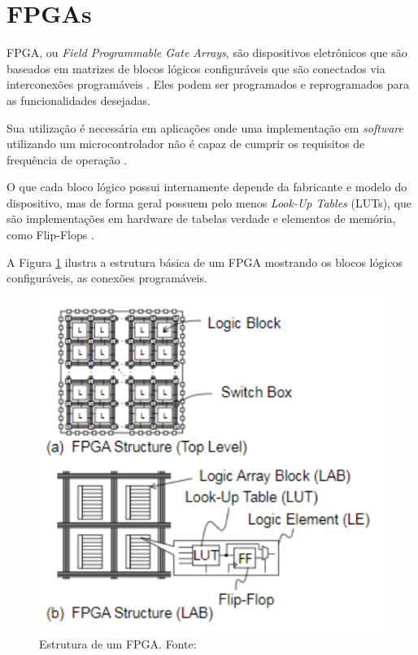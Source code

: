 \section{FPGAs}

FPGA, ou \textit{Field Programmable Gate Arrays}, são dispositivos eletrônicos que são baseados em matrizes de blocos lógicos configuráveis que são conectados via interconexões programáveis \cite{AmdFpga}. Eles podem ser programados e reprogramados para as funcionalidades desejadas.

Sua utilização é necessária em aplicações onde uma implementação em \textit{software} utilizando um microcontrolador não é capaz de cumprir os requisitos de frequência de operação \cite{Sulaiman}.

O que cada bloco lógico possui internamente depende da fabricante e modelo do dispositivo, mas de forma geral possuem pelo menos \textit{Look-Up Tables} (LUTs), que são implementações em hardware de tabelas verdade e elementos de memória, como Flip-Flops \cite{Sato}.

A Figura \ref{fig:FPGAStructure} ilustra a estrutura básica de um FPGA mostrando os blocos lógicos configuráveis, as conexões programáveis.

\begin{figure}[H]
    \centering
    \includegraphics[scale=0.5]{figures/ReferencialTeorico/FPGAStructure.png}
    \caption{Estrutura de um FPGA. Fonte: \cite{Sato}}
    \label{fig:FPGAStructure}
\end{figure}

